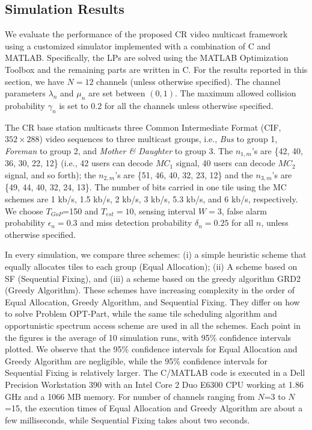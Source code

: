 \documentclass[12pt,onecolumn,draftclsnofoot]{IEEEtran} %
\begin{document}
\subsection{Simulation Results \label{sec:sim}}

We evaluate the performance of the proposed CR video multicast framework using a customized simulator implemented with a combination of C and MATLAB. Specifically, the LPs are solved using the MATLAB Optimization Toolbox and the remaining parts are written in C. For the results reported in this section, we have $N=12$ channels (unless otherwise specified). The channel parameters $\lambda_n$ and $\mu_n$ are set between $(0, 1)$. The maximum allowed collision probability $\gamma_n$ is set to 0.2 for all the channels unless  otherwise specified. 

The CR base station multicasts three Common Intermediate Format (CIF, $352 \times 288$) video sequences to three multicast groups, i.e., {\em Bus} to group 1, {\em Foreman} to group 2, and {\em Mother \& Daughter} to group 3.  The $n_{1,m}$'s are \{42, 40, 36, 30, 22, 12\} (i.e., 42 users can decode $MC_1$ signal, 40 users can decode $MC_2$ signal, and so forth); the $n_{2,m}$'s are \{51, 46, 40, 32, 23, 12\} and the $n_{3,m}$'s are \{49, 44, 40, 32, 24, 13\}.  The number of bits carried in one tile using the MC schemes are 1 kb/s, 1.5 kb/s, 2 kb/s, 3 kb/s, 5.3 kb/s, and 6 kb/s, respectively.  We choose $T_{GoP}$=150 and $T_{est}=10$, sensing interval $W=3$, false alarm probability $\epsilon_n = 0.3$ and miss detection probability $\delta_n = 0.25$ for all $n$, unless otherwise specified. 

In every simulation, we compare three schemes: (i) a simple heuristic scheme that equally allocates tiles to each group (Equal Allocation); (ii) A scheme based on SF (Sequential Fixing), and (iii) a scheme based on the greedy algorithm GRD2 (Greedy Algorithm).  These schemes have increasing complexity in the order of Equal Allocation, Greedy Algorithm, and Sequential Fixing. They differ on how to solve Problem OPT-Part, while the same tile scheduling algorithm and opportunistic spectrum access scheme are used in all the schemes.  Each point in the figures is the average of 10 simulation runs, with 95\% confidence intervals plotted.  We observe that the 95\% confidence intervals for Equal Allocation and Greedy Algorithm are negligible, while the 95\% confidence intervals for Sequential Fixing is relatively larger.  The C/MATLAB code is executed in a Dell Precision Workstation 390 with an Intel Core 2 Duo E6300 CPU working at 1.86 GHz and a 1066 MB memory.  For number of channels ranging from $N$=3 to $N$=15, the execution times of Equal Allocation and Greedy Algorithm are about a few milliseconds, while Sequential Fixing takes about two seconds.  
\end{document}
